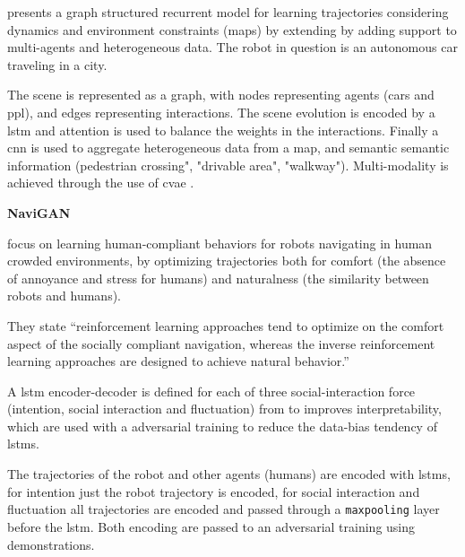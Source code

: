 
\cite{salzmann2020trajectron++}  presents a graph structured recurrent model for learning trajectories considering dynamics and environment constraints (maps) by extending \cite{ivanovic2019trajectron} by adding support to multi-agents and heterogeneous data. The robot in question is an autonomous car traveling in a city.  

The scene is represented as a graph, with nodes representing agents (cars and ppl), and edges representing interactions.
%
The scene evolution is encoded by a \gls{lstm} and attention is used to balance the weights in the interactions.
%
Finally a \gls{cnn} is used to aggregate heterogeneous data from a map, and semantic semantic information (pedestrian crossing", "drivable area", "walkway"). 
%
Multi-modality is achieved through the use of \gls{cvae} .


\textbf{NaviGAN}

\cite{tsai2020generative} focus on learning human-compliant behaviors for robots navigating in human crowded environments, by optimizing trajectories both for comfort (the absence of annoyance and stress for humans) and naturalness (the similarity between robots and humans).

They state ``reinforcement learning approaches tend to optimize on the comfort aspect of the socially compliant navigation, whereas the inverse reinforcement learning approaches are designed to achieve natural behavior.''

A \gls{lstm} encoder-decoder is defined for each of three social-interaction force (intention, social interaction and fluctuation) from \cite{helbing1995social} to improves interpretability, which are used with a adversarial training to reduce the data-bias tendency of \glspl{lstm}.

The trajectories of the robot and other agents (humans) are encoded with \glspl{lstm}, for intention just the robot trajectory is encoded, for social interaction and fluctuation all trajectories are encoded and passed through a \texttt{maxpooling} layer before the \gls{lstm}.
%
Both encoding are passed to an adversarial training using demonstrations.



